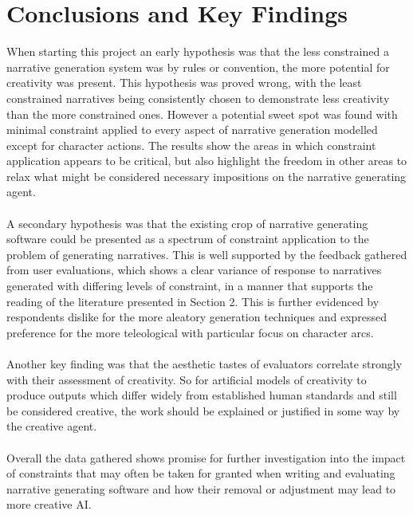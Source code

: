 \documentclass[letterpaper]{article}
\begin{document}
\section{Conclusions and Key Findings}
When starting this project an early hypothesis was that the less constrained a narrative generation system was by rules or convention, the more potential for creativity was present. This hypothesis was proved wrong, with the least constrained narratives being consistently chosen to demonstrate less creativity than the more constrained ones. However a potential sweet spot was found with minimal constraint applied to every aspect of narrative generation modelled except for character actions. The results show the areas in which constraint application appears to be critical, but also highlight the freedom in other areas to relax what might be considered necessary impositions on the narrative generating agent.\\
\\A secondary hypothesis was that the existing crop of narrative generating software could be presented as a spectrum of constraint application to the problem of generating narratives. This is well supported by the feedback gathered from user evaluations, which shows a clear variance of response to narratives generated with differing levels of constraint, in a manner that supports the reading of the literature presented in Section 2. This is further evidenced by respondents dislike for the more aleatory generation techniques and expressed preference for the more teleological with particular focus on character arcs.\\
\\Another key finding was that the aesthetic tastes of evaluators correlate strongly with their assessment of creativity. So for artificial models of creativity to produce outputs which differ widely from established human standards and still be considered creative, the work should be explained or justified in some way by the creative agent.\\
\\Overall the data gathered shows promise for further investigation into the impact of constraints that may often be taken for granted when writing and evaluating narrative generating software and how their removal or adjustment may lead to more creative AI. 


\end{document}
